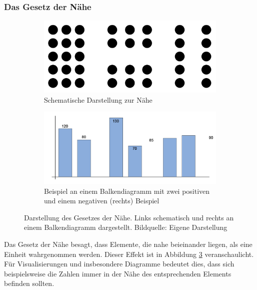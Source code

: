 \subsubsection{Das Gesetz der Nähe}
\begin{figure}[ht]
\begin{subfigure}{.5\linewidth}
  \centering
  \includegraphics[width=.95\linewidth]{img/gNaehe}  
  \caption{Schematische Darstellung zur Nähe}
  \label{fig:naeheSchema}
\end{subfigure}
\begin{subfigure}{.5\linewidth}
  \centering
  \includegraphics[width=.95\linewidth]{img/gNaeheDia}  
  \caption{Beispiel an einem Balkendiagramm mit zwei positiven und einem negativen (rechts) Beispiel}
  \label{fig:naeheDia}
\end{subfigure}
\caption[Gesetz der Nähe]{Darstellung des Gesetzes der Nähe. Links schematisch und rechts an einem Balkendiagramm dargestellt. Bildquelle: Eigene Darstellung}
\label{fig:naehe}
\end{figure}

Das Gesetz der Nähe besagt, dass Elemente, die nahe beieinander liegen, als eine Einheit wahrgenommen werden.
Dieser Effekt ist in Abbildung \ref{fig:naehe} veranschaulicht.
Für Visualisierungen und insbesondere Diagramme bedeutet dies, dass sich beispielsweise die Zahlen immer in der Nähe des entsprechenden Elements befinden sollten.

